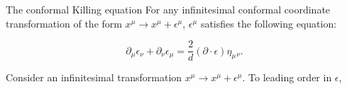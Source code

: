 
\begin{thm*}{The conformal Killing equation}{} 
    For any infinitesimal conformal coordinate transformation of the form $x^\mu \rightarrow x^\mu + \epsilon^\mu$, $\epsilon^\mu$ satisfies the following equation:

    \[
        \partial_\mu \epsilon_\nu + \partial_\nu \epsilon_\mu = \frac{2}{d} (\partial\cdot\epsilon	)\eta_\mu{}_\nu.
    \]

\end{thm*}

\begin{prf*}{}{}
    Consider an infinitesimal transformation $x^\mu \rightarrow x^\mu + \epsilon^\mu$. To leading order in $\epsilon$,
\end{prf*}

